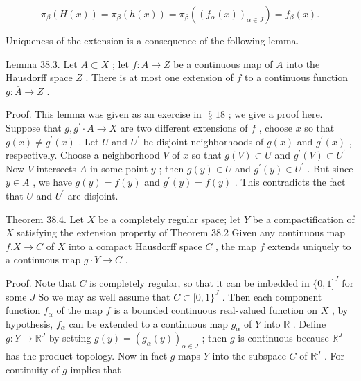 \documentclass[10pt]{article}
\begin{document}
\[
{\pi }_{\beta }\left( {H\left( x\right) }\right)  = {\pi }_{\beta }\left( {h\left( x\right) }\right)  = {\pi }_{\beta }\left( {\left( {f}_{\alpha }\left( x\right) \right) }_{\alpha  \in  J}\right)  = {f}_{\beta }\left( x\right) .
\]

Uniqueness of the extension is a consequence of the following lemma.

Lemma 38.3. Let \(A \subset  X\) ; let \(f : A \rightarrow  Z\) be a continuous map of \(A\) into the Hausdorff space \(Z\) . There is at most one extension of \(f\) to a continuous function \(g : \bar{A} \rightarrow  Z\) .

Proof. This lemma was given as an exercise in \(\text{ § }{18}\) ; we give a proof here. Suppose that \(g,{g}^{\prime } \cdot  \bar{A} \rightarrow  X\) are two different extensions of \(f\) , choose \(x\) so that \(g\left( x\right)  \neq  {g}^{\prime }\left( x\right)\) . Let \(U\) and \({U}^{\prime }\) be disjoint neighborhoods of \(g\left( x\right)\) and \({g}^{\prime }\left( x\right)\) , respectively. Choose a neighborhood \(V\) of \(x\) so that \(g\left( V\right)  \subset  U\) and \({g}^{\prime }\left( V\right)  \subset  {U}^{\prime }\) Now \(V\) intersects \(A\) in some point \(y\) ; then \(g\left( y\right)  \in  U\) and \({g}^{\prime }\left( y\right)  \in  {U}^{\prime }\) . But since \(y \in  A\) , we have \(g\left( y\right)  = f\left( y\right)\) and \({g}^{\prime }\left( y\right)  = f\left( y\right)\) . This contradicts the fact that \(U\) and \({U}^{\prime }\) are disjoint.

Theorem 38.4. Let \(X\) be a completely regular space; let \(Y\) be a compactification of \(X\) satisfying the extension property of Theorem 38.2 Given any continuous map \(f.X \rightarrow  C\) of \(X\) into a compact Hausdorff space \(C\) , the map \(f\) extends uniquely to a continuous map \(g \cdot  Y \rightarrow  C\) .

Proof. Note that \(C\) is completely regular, so that it can be imbedded in \(\{ 0,1{\rbrack }^{J}\) for some \(J\) So we may as well assume that \(C \subset  \lbrack 0,1{\} }^{J}\) . Then each component function \({f}_{\alpha }\) of the map \(f\) is a bounded continuous real-valued function on \(X\) , by hypothesis, \({f}_{\alpha }\) can be extended to a continuous map \({g}_{\alpha }\) of \(Y\) into \(\mathbb{R}\) . Define \(g : Y \rightarrow  {\mathbb{R}}^{J}\) by setting \(g\left( y\right)  = {\left( {g}_{\alpha }\left( y\right) \right) }_{\alpha  \in  J}\) ; then \(g\) is continuous because \({\mathbb{R}}^{J}\) has the product topology. Now in fact \(g\) maps \(Y\) into the subspace \(C\) of \({\mathbb{R}}^{J}\) . For continuity of \(g\) implies that
\end{document}
